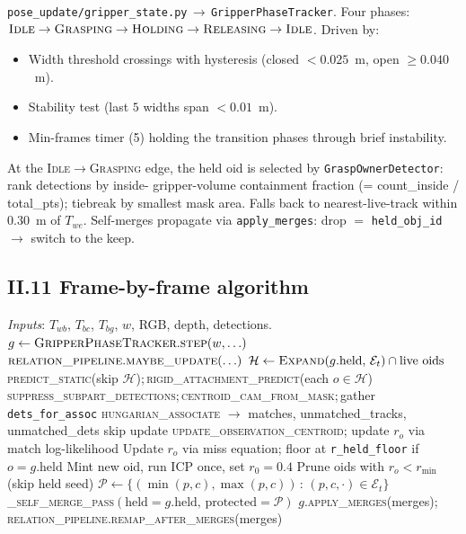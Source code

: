 \documentclass[11pt]{article}
\newcommand{\file}[1]{\texttt{#1}}
\begin{document}
\file{pose\_update/gripper\_state.py}\,$\to$\,\texttt{GripperPhaseTracker}.
Four phases:
$\textsc{Idle}\to\textsc{Grasping}\to\textsc{Holding}\to\textsc{Releasing}\to\textsc{Idle}$.
Driven by:
\begin{itemize}
\item Width threshold crossings with hysteresis (closed $<0.025$~m, open $\ge 0.040$~m).
\item Stability test (last $5$ widths span $<0.01$~m).
\item Min-frames timer (5) holding the transition phases through brief instability.
\end{itemize}
At the \textsc{Idle}$\to$\textsc{Grasping} edge, the held oid is
selected by \texttt{GraspOwnerDetector}: rank detections by inside-
gripper-volume containment fraction (= count\_inside / total\_pts);
tiebreak by smallest mask area. Falls back to nearest-live-track
within $0.30$~m of $T_{we}$. Self-merges propagate via
\texttt{apply\_merges}: drop $=$ \texttt{held\_obj\_id} $\to$ switch
to the keep.

\subsection*{II.11 Frame-by-frame algorithm}

\begin{algorithm}[H]
\caption{One frame of the Bernoulli-EKF tracker (driver loop).}
\begin{algorithmic}[1]
\State \emph{Inputs}: $T_{wb}$, $T_{bc}$, $T_{bg}$, $w$, RGB, depth, detections.
\State $g \gets \textsc{GripperPhaseTracker}.\textsc{step}(w, \ldots)$
\State $\textsc{relation\_pipeline}.\textsc{maybe\_update}(\ldots)$
\State $\mathcal{H} \gets \textsc{Expand}(g.\text{held},\,\mathcal{E}_t)\cap\text{live oids}$
\State \textsc{predict\_static}(skip $\mathcal{H}$);\,\textsc{rigid\_attachment\_predict}(each $o\in\mathcal{H}$)
\State \textsc{suppress\_subpart\_detections};\,\textsc{centroid\_cam\_from\_mask};\,gather \texttt{dets\_for\_assoc}
\State \textsc{hungarian\_associate} $\to$ matches, unmatched\_tracks, unmatched\_dets
   skip update \EndIf
  \State \textsc{update\_observation\_centroid}; update $r_o$ via match log-likelihood
\EndFor
{}
  \State Update $r_o$ via miss equation; floor at \texttt{r\_held\_floor} if $o = g.\text{held}$
\EndFor
{}
    \State Mint new oid, run ICP once, set $r_0=0.4$
  \EndIf
\EndFor
\State Prune oids with $r_o < r_{\min}$ (skip held seed)
\State $\mathcal{P} \gets \{(\min(p,c),\max(p,c))\,:\,(p,c,\cdot)\in\mathcal{E}_t\}$
\State \textsc{\_self\_merge\_pass}$(\text{held}=g.\text{held},\,\text{protected}=\mathcal{P})$
\State $g$.\textsc{apply\_merges}(merges); \textsc{relation\_pipeline}.\textsc{remap\_after\_merges}(merges)
\end{algorithmic}
\end{algorithm}
\end{document}
